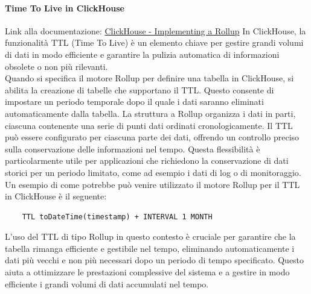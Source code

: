 \paragraph{Time To Live in ClickHouse} \label{sec:RollupTTL}
Link alla documentazione: \href{https://clickhouse.com/docs/en/guides/developer/ttl#implementing-a-rollup}{ClickHouse - Implementing a Rollup}\newline
In ClickHouse, la funzionalità TTL (Time To Live) è un elemento chiave per gestire grandi volumi di dati in modo efficiente e garantire la pulizia automatica di informazioni obsolete o non più rilevanti. \\
Quando si specifica il motore Rollup per definire una tabella in ClickHouse, si abilita la creazione di tabelle che supportano il TTL. Questo consente di impostare un periodo temporale dopo il quale i dati saranno eliminati automaticamente dalla tabella. La struttura a Rollup organizza i dati in parti, ciascuna contenente una serie di punti dati ordinati cronologicamente. Il TTL può essere configurato per ciascuna parte dei dati, offrendo un controllo preciso sulla conservazione delle informazioni nel tempo. Questa flessibilità è particolarmente utile per applicazioni che richiedono la conservazione di dati storici per un periodo limitato, come ad esempio i dati di log o di monitoraggio. \newline
Un esempio di come potrebbe può venire utilizzato il motore Rollup per il TTL in ClickHouse è il seguente:
\begin{verbatim}
    TTL toDateTime(timestamp) + INTERVAL 1 MONTH
\end{verbatim}
L'uso del TTL di tipo Rollup in questo contesto è cruciale per garantire che la tabella rimanga efficiente e gestibile nel tempo, eliminando automaticamente i dati più vecchi e non più necessari dopo un periodo di tempo specificato. Questo aiuta a ottimizzare le prestazioni complessive del sistema e a gestire in modo efficiente i grandi volumi di dati accumulati nel tempo.


